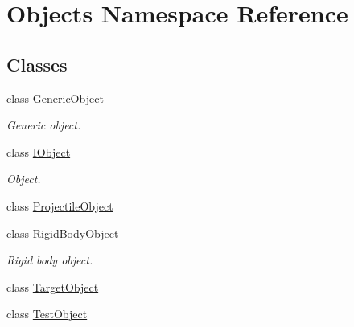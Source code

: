 \hypertarget{namespace_objects}{\section{Objects Namespace Reference}
\label{namespace_objects}
}
\subsection*{Classes}
\begin{DoxyCompactItemize}
\item 
class \hyperlink{class_objects_1_1_generic_object}{Generic\-Object}
\begin{DoxyCompactList}\small\item\em Generic object. \end{DoxyCompactList}\item 
class \hyperlink{class_objects_1_1_i_object}{I\-Object}
\begin{DoxyCompactList}\small\item\em Object. \end{DoxyCompactList}\item 
class \hyperlink{class_objects_1_1_projectile_object}{Projectile\-Object}
\item 
class \hyperlink{class_objects_1_1_rigid_body_object}{Rigid\-Body\-Object}
\begin{DoxyCompactList}\small\item\em Rigid body object. \end{DoxyCompactList}\item 
class \hyperlink{class_objects_1_1_target_object}{Target\-Object}
\item 
class \hyperlink{class_objects_1_1_test_object}{Test\-Object}
\end{DoxyCompactItemize}
